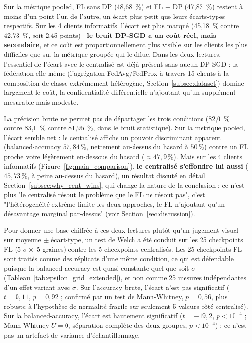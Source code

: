 \documentclass{article}
\begin{document}
Sur la métrique pooled, FL sans DP (48,68~\%) et FL + DP (47,83~\%) restent à moins
d'un point l'un de l'autre, un écart plus petit que leurs écarts-types respectifs.
Sur les 4 clients informatifs, l'écart est plus marqué (45,18~\% contre 42,73~\%,
soit 2,45 points) : \textbf{le bruit DP-SGD a un coût réel, mais secondaire}, et ce
coût est proportionnellement plus visible sur les clients les plus difficiles que sur
la métrique groupée qui le dilue. Dans les deux lectures, l'essentiel de l'écart avec
le centralisé est déjà présent sans aucun DP-SGD : la fédération elle-même
(l'agrégation FedAvg/FedProx à travers 15 clients à la composition de classe
extrêmement hétérogène, Section~\ref{subsec:dataset}) domine largement le coût, la
confidentialité différentielle n'ajoutant qu'un supplément mesurable mais modeste.

La précision brute ne permet pas de départager les trois conditions (82,0~\% contre
83,1~\% contre 81,95~\%, dans le bruit statistique). Sur la métrique pooled, l'écart
semble net : le centralisé affiche un pouvoir discriminant apparent
(balanced-accuracy $57{,}84\,\%$, nettement au-dessus du hasard à $50\,\%$) contre un FL
proche voire légèrement en-dessous du hasard ($\approx 47{,}9\,\%$). Mais sur les 4
clients informatifs (Figure~\ref{fig:main_comparison}), \textbf{le centralisé s'effondre lui aussi} ($45{,}73\,\%$, à peine
au-dessus du hasard), un résultat discuté en détail Section~\ref{subsec:why_cent_wins},
qui change la nature de la conclusion : ce n'est plus "le centralisé résout le
problème que le FL ne résout pas", c'est "l'hétérogénéité extrême limite les deux
approches, le FL n'ajoutant qu'un désavantage marginal par-dessus" (voir
Section~\ref{sec:discussion}).

Pour donner une base chiffrée à ces deux lectures plutôt qu'un jugement visuel sur
moyenne $\pm$ écart-type, un test de Welch a été conduit sur les 25 checkpoints FL
(5 $\sigma \times$ 5 graines) contre les 5 checkpoints centralisés. Les 25 checkpoints
FL sont traités comme des réplicats d'une même condition, ce qui est défendable
puisque la balanced-accuracy est quasi constante quel que soit $\sigma$
(Tableau~\ref{tab:epsilon_grid_extended}), et non comme 25 mesures indépendantes d'un
effet variant avec $\sigma$. Sur l'accuracy brute, l'écart n'est pas significatif
($t=0{,}11$, $p=0{,}92$ ; confirmé par un test de Mann-Whitney, $p=0{,}56$, plus robuste
à l'hypothèse de normalité fragile sur seulement 5 valeurs côté centralisé). Sur la
balanced-accuracy, l'écart est hautement significatif ($t=-19{,}2$, $p < 10^{-4}$ ;
Mann-Whitney $U=0$, séparation complète des deux groupes, $p < 10^{-4}$) : ce n'est pas
un artefact de variance d'échantillonnage.
\end{document}
